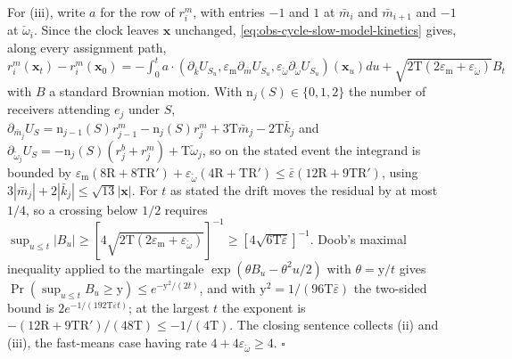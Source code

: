 For (iii), write $a$ for the row of $r^m_i$, with entries $-1$ and $1$ at
$\bar m_i$ and $\bar m_{i+1}$ and $-1$ at $\check\omega_i$. Since the clock leaves
$\mathbf x$ unchanged, \eqref{eq:obs-cycle-slow-model-kinetics} gives, along every
assignment path,
$r^m_i(\mathbf x_t)-r^m_i(\mathbf x_0)=-\int_0^ta\cdot(\partial_{\bar k}U_{S_u},\varepsilon_{\mathrm m}\partial_{\bar m}U_{S_u},\varepsilon_{\check\omega}\partial_{\check\omega} U_{S_u})(\mathbf x_u)du+\sqrt{2\mathrm T(2\varepsilon_{\mathrm m}+\varepsilon_{\check\omega})}B_t$
with $B$ a standard Brownian motion. With $\mathrm n_j(S)\in\{0,1,2\}$ the number of
receivers attending $e_j$ under $S$,
$\partial_{\bar m_j}U_S=\mathrm n_{j-1}(S)r^m_{j-1}-\mathrm n_j(S)r^m_j+3\mathrm T\bar m_j-2\mathrm T\bar k_j$
and $\partial_{\check\omega_j}U_S=-\mathrm n_j(S)(r^b_j+r^m_j)+\mathrm T\check\omega_j$, so on the
stated event the integrand is bounded by
$\varepsilon_{\mathrm m}(8\mathrm R+8\mathrm T\mathrm R')+\varepsilon_{\check\omega}(4\mathrm R+\mathrm T\mathrm R')\le\bar\varepsilon(12\mathrm R+9\mathrm T\mathrm R')$,
using $3|\bar m_j|+2|\bar k_j|\le\sqrt{13}|\mathbf x|$. For $t$ as stated the drift
moves the residual by at most $1/4$, so a crossing below $1/2$ requires
$\sup_{u\le t}|B_u|\ge[4\sqrt{2\mathrm T(2\varepsilon_{\mathrm m}+\varepsilon_{\check\omega})}]^{-1}\ge[4\sqrt{6\mathrm T\bar\varepsilon}]^{-1}$.
Doob's maximal inequality applied to the martingale $\exp(\theta B_u-\theta^2u/2)$
with $\theta=\mathrm y/t$ gives $\Pr(\sup_{u\le t}B_u\ge\mathrm y)\le e^{-\mathrm y^2/(2t)}$,
and with $\mathrm y^2=1/(96\mathrm T\bar\varepsilon)$ the two-sided bound is
$2e^{-1/(192\mathrm T\bar\varepsilon t)}$; at the largest $t$ the exponent is
$-(12\mathrm R+9\mathrm T\mathrm R')/(48\mathrm T)\le-1/(4\mathrm T)$. The closing
sentence collects (ii) and (iii), the fast-means case having rate
$4+4\varepsilon_{\check\omega}\ge4$. $\square$

